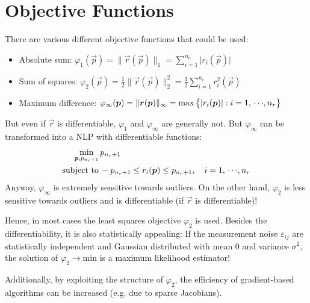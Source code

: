 	\section{Objective Functions}
		There are various different objective functions that could be used:
		\begin{itemize}
			\item Absolute sum: \tabto{4cm} \( \varphi_1(\vec{p}) = \lVert \vec{r}(\vec{p}) \rVert_1 = \sum_{i = 1}^{n_r} \lvert r_i(\vec{p}) \rvert \)
			\item Sum of squares: \tabto{4cm} \( \varphi_2(\vec{p}) = \frac{1}{2} \lVert \vec{r}(\vec{p}) \rVert_2^2 = \frac{1}{2} \sum_{i = 1}^{n_r} r_i^2(\vec{p}) \)
			\item Maximum difference: \tabto{4cm} \( \varphi_\infty(\bm{p}) = \lVert \bm{r}(\bm{p}) \rVert_\infty = \max\big\{ \lvert r_i(\bm{p}) \rvert : i = 1,\,\cdots\!,n_r \big\} \)
		\end{itemize}
		But even if \(\vec{r}\) is differentiable, \(\varphi_1\) and \(\varphi_\infty\) are generally not. But \(\varphi_\infty\) can be transformed into a NLP with differentiable functions:
		\begin{align*}
			\min_{\bm{p}, p_{n_r + 1}} & \, p_{n_r + 1} \\
			\mathrm{subject~to}         & \,
			-p_{n_r + 1} \leq r_i(\bm{p}) \leq p_{n_r + 1},\quad i = 1,\,\cdots\!,n_r
		\end{align*}
		Anyway, \(\varphi_\infty\) is extremely sensitive towards outliers. On the other hand, \(\varphi_2\) is less sensitive towards outliers and is differentiable (if \(\vec{r}\) is differentiable)!

		Hence, in most cases the least squares objective \(\varphi_2\) is used. Besides the differentiability, it is also statistically appealing: If the measurement noise \(\varepsilon_{ij}\) are statistically independent and Gaussian distributed with mean \(0\) and variance \(\sigma^2\), the solution of \( \varphi_2 \to \mathrm{min} \) is a maximum likelihood estimator!

		Additionally, by exploiting the structure of \(\varphi_2\), the efficiency of gradient-based algorithms can be increased (e.g. due to sparse Jacobians).

